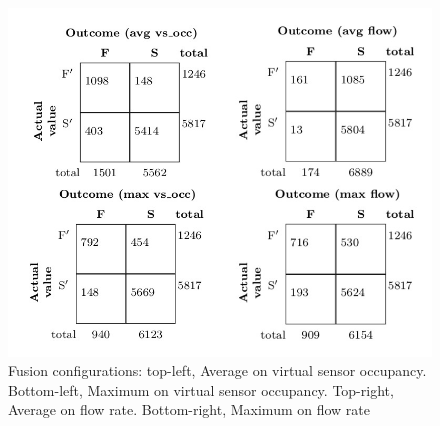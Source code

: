 \begin{figure}[htb!]
\centering
\includegraphics[scale=0.4]{fig/4/conf_mat.jpeg}
\caption{Fusion configurations: top-left, Average on virtual sensor occupancy. Bottom-left, Maximum on virtual sensor occupancy. Top-right, Average on flow rate. Bottom-right, Maximum on flow rate}
\label{vl_cf}
\end{figure}

